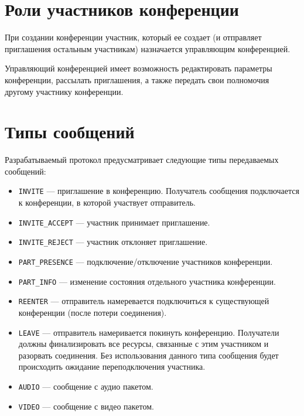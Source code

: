\section{Роли участников конференции}

При создании конференции участник, который ее создает (и отправляет приглашения остальным участникам) назначается управляющим конференцией.

Управляющий конференцией имеет возможность редактировать параметры конференции, рассылать приглашения, а также передать свои полномочия другому участнику конференции.




\section{Типы сообщений}

Разрабатываемый протокол предусматривает следующие типы передаваемых сообщений:
\begin{itemize}[label=---]
    \item \texttt{INVITE} --- приглашение в конференцию. Получатель сообщения подключается к конференции, в которой участвует отправитель.
    \item \texttt{INVITE\_ACCEPT} --- участник принимает приглашение.
    \item \texttt{INVITE\_REJECT} --- участник отклоняет приглашение.
    \item \texttt{PART\_PRESENCE} --- подключение/отключение участников конференции.
    \item \texttt{PART\_INFO} --- изменение состояния отдельного участника конференции.
    \item \texttt{REENTER} --- отправитель намеревается подключиться к существующей конференции (после потери соединения).
    \item \texttt{LEAVE} --- отправитель намеривается покинуть конференцию. Получатели должны финализировать все ресурсы, связанные с этим участником и разорвать соединения. Без использования данного типа сообщения будет происходить ожидание переподключения участника.
    \item \texttt{AUDIO} --- сообщение с аудио пакетом.
    \item \texttt{VIDEO} --- сообщение с видео пакетом.
\end{itemize}

